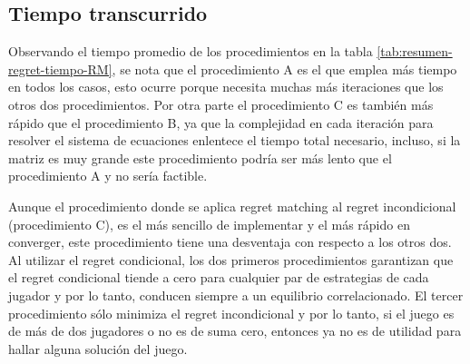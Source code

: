 \subsection{Tiempo transcurrido}

Observando el tiempo promedio de los procedimientos en la tabla \ref{tab:resumen-regret-tiempo-RM}, se nota que el procedimiento A es el que emplea más tiempo en todos los casos, esto ocurre porque necesita muchas más iteraciones que los otros dos procedimientos. Por otra parte el procedimiento C es también más rápido que el procedimiento B, ya que la complejidad en cada iteración para resolver el sistema de ecuaciones enlentece el tiempo total necesario, incluso, si la matriz es muy grande este procedimiento podría ser más lento que el procedimiento A y no sería factible.

Aunque el procedimiento donde se aplica regret matching al regret incondicional (procedimiento C), es el más sencillo de implementar y el más rápido en converger, este procedimiento tiene una desventaja con respecto a los otros dos. Al utilizar el regret condicional, los dos primeros procedimientos garantizan que el regret condicional tiende a cero para cualquier par de estrategias de cada jugador y por lo tanto, conducen siempre a un equilibrio correlacionado. El tercer procedimiento sólo minimiza el regret incondicional y por lo tanto, si el juego es de más de dos jugadores o no es de suma cero, entonces ya no es de utilidad para hallar alguna solución del juego.

